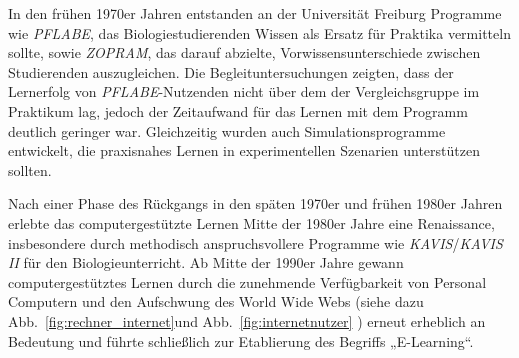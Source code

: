 In den frühen 1970er Jahren entstanden an der Universität Freiburg Programme wie \textit{PFLABE}, das Biologiestudierenden Wissen als Ersatz für Praktika vermitteln sollte, sowie \textit{ZOPRAM}, das darauf abzielte, Vorwissensunterschiede zwischen Studierenden auszugleichen. Die Begleituntersuchungen zeigten, dass der Lernerfolg von \textit{PFLABE}-Nutzenden nicht über dem der Vergleichsgruppe im Praktikum lag, jedoch der Zeitaufwand für das Lernen mit dem Programm deutlich geringer war. Gleichzeitig wurden auch Simulationsprogramme entwickelt, die praxisnahes Lernen in experimentellen Szenarien unterstützen sollten.\parencite[S.~11]{niegemann_kompendium_2008}

Nach einer Phase des Rückgangs in den späten 1970er und frühen 1980er Jahren erlebte das computergestützte Lernen Mitte der 1980er Jahre eine Renaissance, insbesondere durch methodisch anspruchsvollere Programme wie \textit{KAVIS}/\textit{KAVIS II} für den Biologieunterricht. Ab Mitte der 1990er Jahre gewann computergestütztes Lernen durch die zunehmende Verfügbarkeit von Personal Computern und den Aufschwung des World Wide Webs (siehe dazu Abb.~\ref{fig:rechner_internet}und Abb.~\ref{fig:internetnutzer} ) erneut erheblich an Bedeutung und führte schließlich zur Etablierung des Begriffs „E-Learning“.\parencite[S.~11]{niegemann_kompendium_2008}

